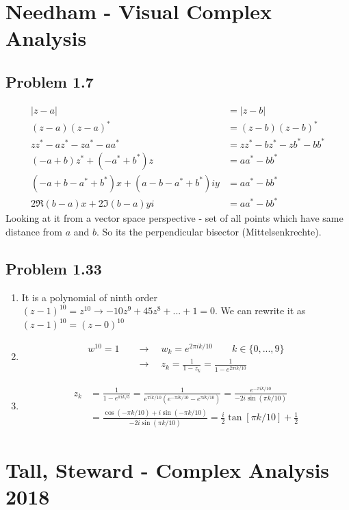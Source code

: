 \documentclass[10pt,a4paper]{book}
\theoremstyle{definition}
\begin{document}
\newpage
\section{{\sc Needham} - Visual Complex Analysis}
\subsection{Problem 1.7}
\begin{align}
|z-a|&=|z-b|\\
(z-a)(z-a)^*&=(z-b)(z-b)^*\\
zz^*-az^*-za^*-aa^*&=zz^*-bz^*-zb^*-bb^*\\
(-a+b)z^*+(-a^*+b^*)z&=aa^*-bb^*\\
(-a+b-a^*+b^*)x+(a-b-a^*+b^*)iy&=aa^*-bb^*\\
2\Re(b-a)x+2\Im(b-a)yi&=aa^*-bb^*
\end{align}
Looking at it from a vector space perspective - set of all points which have same distance from $a$ and $b$. So its the perpendicular bisector (Mittelsenkrechte).


\subsection{Problem 1.33}
\begin{enumerate}
\item It is a polynomial of ninth order 
$(z-1)^{10}=z^{10}\rightarrow -10z^9+45z^8+...+1=0$.
We can rewrite it as $(z-1)^{10}=(z-0)^{10}$
\item 
\begin{align}
w^{10}=1\quad
&\rightarrow\quad w_k=e^{2\pi ik/10}\qquad k\in\{0,...,9\}\\
&\rightarrow\quad z_k=\frac{1}{1-z_k}=\frac{1}{1-e^{2\pi ik/10}}
\end{align}

\item 
\begin{align}
z_k&=\frac{1}{1-e^{\pi ik/5}}
=\frac{1}{e^{\pi ik/10}(e^{-\pi ik/10}-e^{\pi ik/10})}
=\frac{e^{-\pi ik/10}}{-2i\sin(\pi k/10)}\\
&=\frac{\cos(-\pi k/10)+i\sin(-\pi k/10)}{-2i\sin(\pi k/10)}
=\frac{i}{2}\tan[\pi k/10]+\frac{1}{2}
\end{align}

\end{enumerate}

\section{{\sc Tall, Steward} - Complex Analysis 2018}
\end{document}
